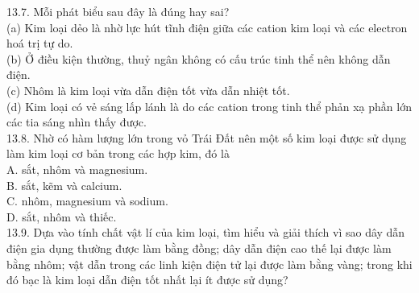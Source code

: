 \documentclass[10pt]{article}
\begin{document}
13.7. Mỗi phát biểu sau đây là đúng hay sai?\\
(a) Kim loại dẻo là nhờ lực hút tĩnh điện giữa các cation kim loại và các electron hoá trị tự do.\\
(b) Ở điều kiện thường, thuỷ ngân không có cấu trúc tinh thể nên không dẫn điện.\\
(c) Nhôm là kim loại vừa dẫn điện tốt vừa dẫn nhiệt tốt.\\
(d) Kim loại có vẻ sáng lấp lánh là do các cation trong tinh thể phản xạ phần lớn các tia sáng nhìn thấy được.\\
13.8. Nhờ có hàm lượng lớn trong vỏ Trái Đất nên một số kim loại được sử dụng làm kim loại cơ bản trong các hợp kim, đó là\\
A. sắt, nhôm và magnesium.\\
B. sắt, kẽm và calcium.\\
C. nhôm, magnesium và sodium.\\
D. sắt, nhôm và thiếc.\\
13.9. Dựa vào tính chất vật lí của kim loại, tìm hiểu và giải thích vì sao dây dẫn điện gia dụng thường được làm bằng đồng; dây dẫn điện cao thế lại được làm bằng nhôm; vật dẫn trong các linh kiện điện tử lại được làm bằng vàng; trong khi đó bạc là kim loại dẫn điện tốt nhất lại ít được sử dụng?
\end{document}
